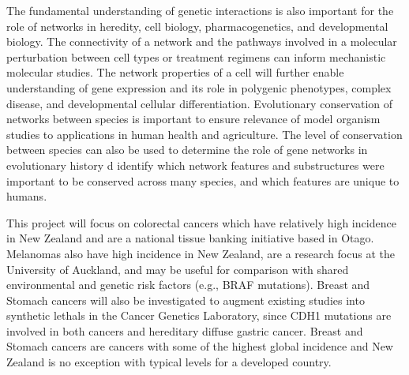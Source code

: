 The fundamental understanding of genetic interactions is also important for the role of networks in heredity, cell biology, pharmacogenetics, and developmental biology. The connectivity of a network and the pathways involved in a molecular perturbation between cell types or treatment regimens can inform mechanistic molecular studies. The network properties of a cell will further enable understanding of \gls{gene expression} and its role in polygenic phenotypes, complex disease, and developmental cellular differentiation. Evolutionary conservation of networks between species is important to ensure relevance of model organism studies to applications in human health and agriculture. The level of conservation between species can also be used to determine the role of gene networks in evolutionary history d identify which network features and substructures were important to be conserved across many species, and which features are unique to humans.

This project will focus on colorectal cancers which have relatively high incidence in New Zealand and are a national tissue banking initiative based in Otago. Melanomas also have high incidence in New Zealand, are a research focus at the University of Auckland, and may be useful for comparison with shared environmental and genetic risk factors (e.g., BRAF \glspl{mutation}). Breast and Stomach cancers will also be investigated to augment existing studies into \glspl{synthetic lethal} in the Cancer Genetics Laboratory, since CDH1 \glspl{mutation} are involved in both  cancers and \gls{hereditary} diffuse gastric cancer. Breast and Stomach cancers are cancers with some of the highest global incidence and New Zealand is no exception with typical levels for a developed country.



